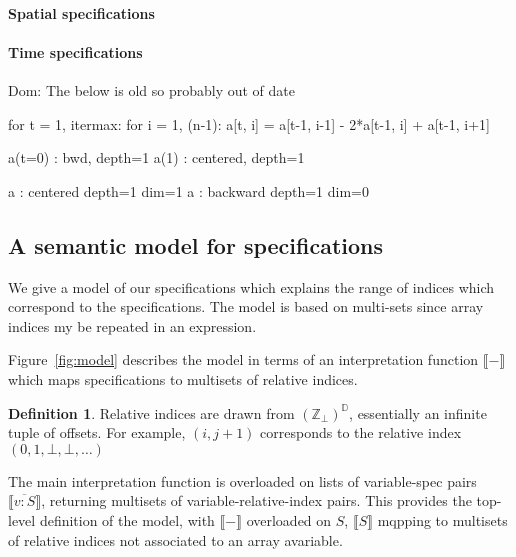 \documentclass[9pt]{sigplanconf}
\newcommand{\dnote}[1]{\textcolor{darkpurple}{Dom: #1}}
\newcounter{block}
\theoremstyle{definition}
\newtheorem{definition}[block]{Definition}
\newcommand{\interp}[1]{\llbracket{#1}\rrbracket}
\begin{document}
\paragraph{Spatial specifications}




\paragraph{Time specifications}
\dnote{The below is old so probably out of date}

\begin{ExmVerbatim}
for t = 1, itermax:
   for i = 1, (n-1):
      a[t, i] = a[t-1, i-1] - 2*a[t-1, i] + a[t-1, i+1]
\end{ExmVerbatim}

\begin{SpecVerbatim}
a(t=0) : bwd, depth=1
a(1)   : centered, depth=1
\end{SpecVerbatim}

\begin{SpecVerbatim}
a : centered depth=1 dim=1
a : backward depth=1 dim=0
\end{SpecVerbatim}

\subsection{A semantic model for specifications}
\label{sec:semantics}

\newcommand{\relix}{(\mathbb{Z}_\bot)^\mathbb{D}}

We give a model of our specifications which explains
the range of indices which correspond to the specifications.
The model is based on multi-sets since array indices my be repeated
in an expression.

Figure~\ref{fig:model} describes the model in terms of
an interpretation function $\interp{-}$ which maps specifications
to multisets of relative indices.

\begin{definition}Relative indices are drawn
from $(\mathbb{Z}_{\bot})^{\mathbb{D}}$, essentially an infinite
tuple of offsets. For example, $(i, j+1)$ corresponds to
the relative index $(0, 1, \bot, \bot, \ldots)$
\end{definition}

The main interpretation function is overloaded on lists of
variable-spec pairs $\interp{\overline{v : S}}$,
returning multisets of variable-relative-index pairs. This provides
the top-level definition of the model, with $\interp{-}$ overloaded
on $S$, $\interp{S}$ mqpping to multisets of
relative indices not associated to an array avariable.
\end{document}
